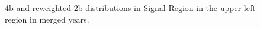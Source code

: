 \begin{figure}[ht]
 
 
    \caption{4b and reweighted 2b distributions in Signal Region in the upper left region in merged years.}
    \label{fig:upper-left-4bvbf-SR-all}
\end{figure}


